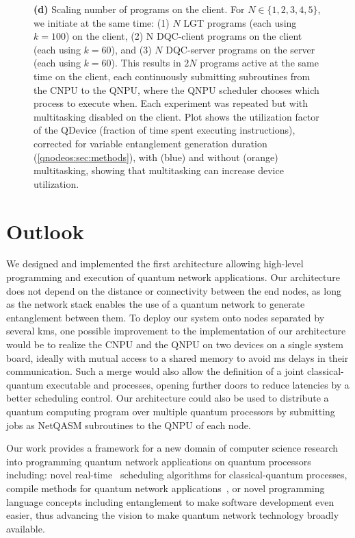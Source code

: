 \begin{figure}[htbp]
{\textbf{(d)} Scaling number of programs on the client. For $N \in \{1,2,3,4,5\}$, we initiate at the same time: (1) $N$ LGT programs (each using $k=100$) on the client, (2) N DQC-client programs on the client (each using $k=60$), and (3) $N$ DQC-server programs on the server (each using $k=60$). This results in $2N$ programs active at the same time on the client, each continuously submitting subroutines from the CNPU to the QNPU, where the QNPU scheduler chooses which process to execute when. Each experiment was repeated but with multitasking disabled on the client. Plot shows the utilization factor of the QDevice (fraction of time spent executing instructions), corrected for variable entanglement generation duration (\cref{qnodeos:sec:methods}), with (blue) and without (orange) multitasking, showing that multitasking can increase device utilization.}
\label{qnodeos:fig:fig4}
\end{figure}

\section{Outlook}
We designed and implemented the first architecture allowing high-level programming and execution of quantum network applications.
Our architecture does not depend on the distance or connectivity between the end nodes, as long as the network stack enables the use of a quantum network to generate entanglement between them. 
To deploy our system onto nodes separated by several kms, one possible improvement to the implementation of our architecture would be to realize the CNPU and the QNPU on two devices on a single system board, ideally with mutual access to a shared memory to avoid ms delays in their communication.
Such a merge would also allow the definition of a joint classical-quantum executable and processes, opening further doors to reduce latencies by a better scheduling control.
Our architecture could also be used to distribute a quantum computing program over multiple quantum processors by submitting jobs as NetQASM subroutines to the QNPU of each node.

Our work provides a framework for a new domain of computer science research into programming quantum network applications on quantum processors including: novel real-time~\cite{ramamritham_scheduling_1994} scheduling algorithms for classical-quantum processes, compile methods for quantum network applications~\cite{dahlberg_2022_netqasm}, or novel programming language concepts including entanglement to make software development even easier, thus advancing the vision to make quantum network technology broadly available.


